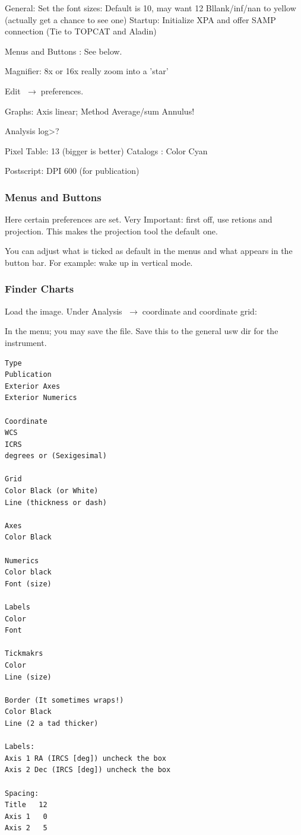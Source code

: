 \documentclass[letter,11pt,oneside]{article}
\newcommand{\menu}{\ensuremath{\;\rightarrow\;}}
\begin{document}
General:
   Set the font sizes: Default is 10, may want 12
   Bllank/inf/nan to yellow (actually get a chance to see one)
Startup:
   Initialize XPA and offer SAMP connection (Tie to TOPCAT and Aladin)

Menus and Buttons : See below.

Magnifier: 8x or 16x really zoom into a 'star'

Edit \menu preferences.

Graphs: Axis linear; Method Average/sum
Annulus! 

Analysis log>?

Pixel Table: 13   (bigger is better)
Catalogs : Color Cyan

Postscript: DPI 600 (for publication)

\subsubsection{Menus and Buttons}

Here certain preferences are set.
Very Important: first off, use retions and projection.
This makes the projection tool the default one.

You can adjust what is ticked as default in the menus
and what appears in the button bar.
For example: wake up in vertical mode.

\subsubsection{Finder Charts}

Load the image.
Under Analysis \menu coordinate and coordinate grid:

In the menu; you may save the file.
Save this to the general usw dir for the instrument.


\begingroup \fontsize{10pt}{10pt}
\selectfont
\begin{verbatim} 
Type
Publication
Exterior Axes
Exterior Numerics

Coordinate
WCS
ICRS
degrees or (Sexigesimal) 

Grid
Color Black (or White)
Line (thickness or dash)

Axes
Color Black

Numerics
Color black
Font (size)

Labels
Color
Font

Tickmakrs
Color
Line (size)

Border (It sometimes wraps!)
Color Black
Line (2 a tad thicker)

Labels:
Axis 1 RA (IRCS [deg]) uncheck the box
Axis 2 Dec (IRCS [deg]) uncheck the box

Spacing:
Title   12
Axis 1   0
Axis 2   5
\end{verbatim}
\endgroup
\end{document}
